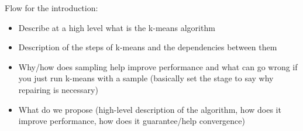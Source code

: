 
Flow for the introduction:
\begin{itemize}
    \item Describe at a high level what is the k-means algorithm
    \item Description of the steps of k-means and the dependencies between them
    \item Why/how does sampling help improve performance and what can go wrong if you just run k-means with a sample (basically set the stage to say why repairing is necessary)
    \item What do we propose (high-level description of the algorithm, how does it improve performance, how does it guarantee/help convergence)
\end{itemize}
